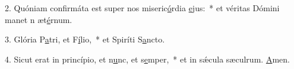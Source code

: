 2. Quóniam confirmáta est super nos miseric\uline{ó}rdia \uline{e}jus:~* et véritas Dómini manet n æt\uline{é}rnum.\par 
3. Glória P\uline{a}tri, et F\uline{í}lio,~* et Spiríti S\uline{a}ncto.\par 
4. Sicut erat in princípio, et n\uline{u}nc, et s\uline{e}mper,~* et in sǽcula sæculrum. \uline{A}men.\par 
